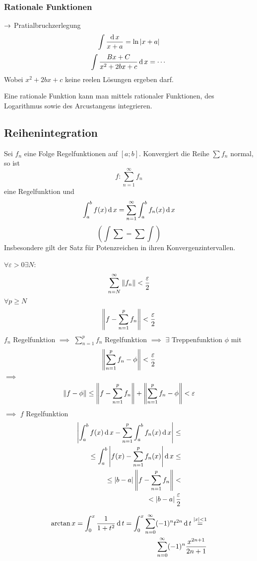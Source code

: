 \subsubsection{Rationale Funktionen}
$\rightarrow$ Pratialbruchzerlegung
\[\int\frac{\operatorname{d} x}{x+a}=\ln\left| x+a \right|\]
\[\int\frac{Bx+C}{x^2+2bx+c}\operatorname{d} x=\cdots\]
Wobei $x^2+2bx+c$ keine reelen Lösungen ergeben darf.
\begin{Sat}
  Eine rationale Funktion kann man mittels rationaler Funktionen, des Logarithmus sowie des Arcustangens integrieren.
\end{Sat}
\subsection{Reihenintegration}
\begin{Sat}
  Sei $f_n$ eine Folge Regelfunktionen auf $[a;b]$. Konvergiert die Reihe $\sum f_n$ normal, so ist 
  \[f:\sum^\infty_{n=1}f_n\]
  eine Regelfunktion und
  \[\int^b_af(x)\operatorname{d} x=\sum^\infty_{n=1}\int^b_af_n(x)\operatorname{d} x\]
  \[(\int\sum = \sum\int)\]
  Insbesondere gilt der Satz für Potenzreichen in ihren Konvergenzintervallen.
\end{Sat}
\begin{Bew}
  $\forall\varepsilon >0 \exists N$:
  \begin{align*}
    \sum^\infty_{n=N}\left\| f_n \right\|<\frac{\varepsilon}{2}
  \end{align*}
  $\forall p\geq N$
  \begin{align*}
    \left\| f-\sum^p_{n=1}f_n \right\|<\frac{\varepsilon}{2}
  \end{align*}
  $f_n$ Regelfunktion $\implies$ $\sum^p_{n=1}f_n$ Regelfunktion $\implies$ $\exists$ Treppenfunktion $\phi$ mit
 \begin{align*}
   \left\| \sum^p_{n=1}f_n-\phi \right\|<\frac{\varepsilon}{2}
 \end{align*}
 $\implies$
 \begin{align*}
   \left\| f-\phi \right\|\leq \left\| f-\sum^p_{n=1}f_n \right\|+\left\| \sum^p_{n=1}f_n-\phi \right\|<\varepsilon
 \end{align*}
 $\implies$ $f$ Regelfunktion
 \begin{align*}
   \left| \int_a^bf(x)\operatorname{d} x-\sum^p_{n=1}\int^b_af_n(x)\operatorname{d} x \right|\leq\\
   \leq \int^b_a\left| f(x)-\sum^p_{n=1}f_n(x) \right|\operatorname{d} x\leq \\
   \leq \left| b-a \right|\left\| f-\sum^p_{n=1}f_n \right\|<\\
   < \left| b-a \right|\frac{\varepsilon}{2}
 \end{align*}
\end{Bew}
\begin{Bsp}
  \begin{align*}
    \arctan x= \int^x_0\frac{1}{1+t^2}\operatorname{d} t=\int^x_0\sum^\infty_{n=0}(-1)^nt^{2n}\operatorname{d} t\stackrel{\left| x \right|<1}{=}\\
    \sum^\infty_{n=0}(-1)^n\frac{x^{2n+1}}{2n+1}
  \end{align*}
\end{Bsp}
